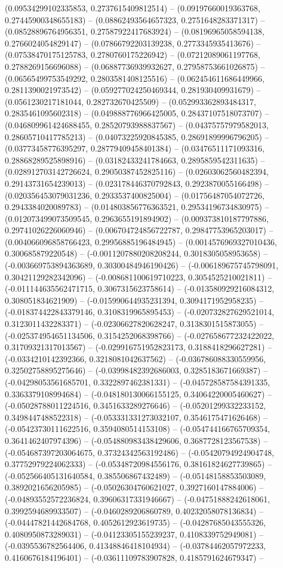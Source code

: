 (0.09534299102335853, 0.2737615409812514) -- (0.09197660019363768, 0.27445900348655183) -- (0.08862493564657323, 0.2751648283371317) -- (0.08528896764956351, 0.27587922417683924) -- (0.08196965058594138, 0.2766024054829147) -- (0.07866792203139238, 0.2773345935413676) -- (0.07538470175125783, 0.2780760175226942) -- (0.07212089061197768, 0.2788269156696088) -- (0.06887736939932627, 0.27958753661026875) -- (0.06565499753549292, 0.2803581408125516) -- (0.062454611686449966, 0.2811390021973542) -- (0.059277024250469344, 0.281930409931679) -- (0.0561230217181044, 0.282732670425509) -- (0.052993362893484317, 0.2835461095602318) -- (0.049888776966425005, 0.28437107518073707) -- (0.046809961424688455, 0.28520793988837567) -- (0.04375757979582013, 0.28605710417785213) -- (0.04073225920845385, 0.28691899996796205) -- (0.03773458776395297, 0.28779409458401384) -- (0.03476511171093316, 0.28868289525898916) -- (0.03182433241784663, 0.2895859542311635) -- (0.028912703142726624, 0.29050387452825116) -- (0.02603062560482394, 0.29143731654239013) -- (0.023178446370792843, 0.2923870055166498) -- (0.020356453079031236, 0.2933537400825004) -- (0.01756487054072726, 0.2943384020089783) -- (0.014803856776363521, 0.29534196734830975) -- (0.012073499073509545, 0.2963655191894902) -- (0.009373810187797886, 0.29741026226060946) -- (0.006704724856722787, 0.29847753965203017) -- (0.004066096858766423, 0.29956885196484945) -- (0.0014576969327010436, 0.300685879220548) -- (-0.0011207880208208244, 0.3018305058953658) -- (-0.003669753894363689, 0.30300484946190426) -- (-0.006189675745798091, 0.30421129282342096) -- (-0.008681100619710223, 0.3054525210021811) -- (-0.011144635562471715, 0.3067315623758614) -- (-0.013580929216084312, 0.308051834621909) -- (-0.015990644935231394, 0.3094171952958235) -- (-0.018374422843379146, 0.3108319965895453) -- (-0.020732827629521014, 0.3123011432283371) -- (-0.02306627820628247, 0.3138301515873055) -- (-0.025374954651134506, 0.3154252068398766) -- (-0.027658677232422022, 0.31709321317013567) -- (-0.029916751952823173, 0.3188418296627281) -- (-0.0334210142392366, 0.3218081042637562) -- (-0.036786088330559956, 0.32502758895275646) -- (-0.03998482392686003, 0.3285183671669387) -- (-0.04298053561685701, 0.3322897462381331) -- (-0.045728587584391335, 0.3363379108994684) -- (-0.048180130066155125, 0.34064220005460627) -- (-0.05028788011224516, 0.3451633289276646) -- (-0.05201299332233152, 0.3498447488522318) -- (-0.053331331273032107, 0.3546175471626468) -- (-0.05423730111622516, 0.3594080514153108) -- (-0.054744166765709354, 0.3641462407974396) -- (-0.054880983438429606, 0.3687728123567538) -- (-0.054687397203064675, 0.37324342563192486) -- (-0.05420794924904748, 0.37752979224062333) -- (-0.05348720984556176, 0.38161824627739865) -- (-0.052566405131640584, 0.385506867432489) -- (-0.05148158853503089, 0.3892021656205985) -- (-0.05026304760621027, 0.3927160147884006) -- (-0.04893552572236824, 0.39606317331946667) -- (-0.04751888242618061, 0.3992594689933507) -- (-0.0460289206860789, 0.40232058078136834) -- (-0.04447821442684768, 0.4052612923619735) -- (-0.04287685043555326, 0.4080950873289031) -- (-0.04123305155239237, 0.4108339752949081) -- (-0.0395536782564406, 0.41348846418104934) -- (-0.03784462057972233, 0.4160676184196401) -- (-0.03611109783907828, 0.4185791624679347) -- 